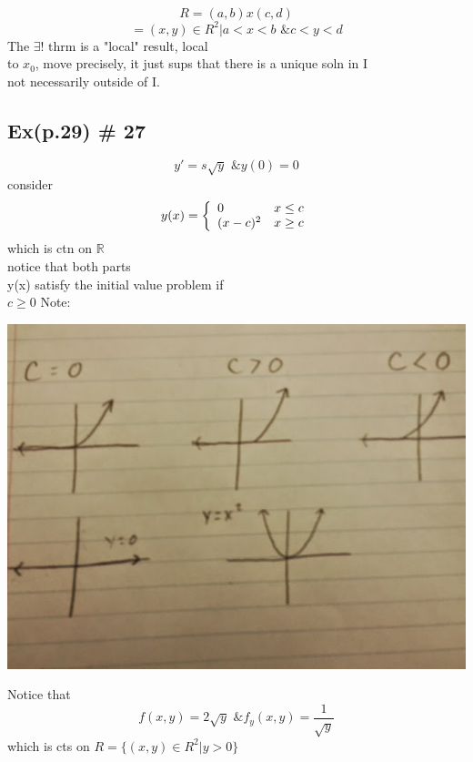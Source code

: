 \documentclass[10pt,a4paper]{article}
\begin{document}
  \[ R = (a, b)x(c, d)\]
  \[ = {(x, y) \in R^2 | a < x < b \text{ \& }  c < y < d } \]
  The \( \exists \text{! thrm} \) is a "local" result, local \\
  to \(x_0\), move precisely, it just sups that there is a unique soln in I \\
  not necessarily outside of I. \\

  \subsection*{Ex(p.29) \# 27}

  \[ y' = s \sqrt{y} \text{ \& } y(0) = 0\]
  consider 
  \[ y(x) = \left\{
  \begin{array}{l l}
    0 & x\leq c \\
    (x-c)^2 &  x \geq c
  \end{array}\right. \]
  which is ctn on \( \mathbb{R} \)  \\
  notice that both parts  \\
  y(x) satisfy the initial value problem if \\
  \( c \geq 0\) Note: 

  \includegraphics[scale=.45]{pic2}

  Notice that
  \[ f(x, y) = 2\sqrt{y} \text{ \& } f_y(x, y) = \frac{1}{ \sqrt{y}}\]
  which is cts on \( R = \{ (x, y) \in R^2 |  y > 0\}\)
\end{document}
